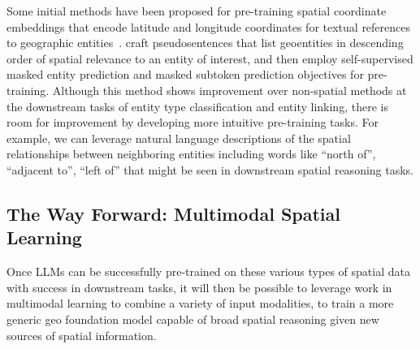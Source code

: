 Some initial methods have been proposed for pre-training spatial coordinate embeddings that encode latitude and longitude coordinates for textual references to geographic entities~\cite{Li2021}.
\citeauthor{Li2021} craft pseudosentences that list geoentities in descending order of spatial relevance to an entity of interest, and then employ self-supervised masked entity prediction and masked subtoken prediction objectives for pre-training.
Although this method shows improvement over non-spatial methods at the downstream tasks of entity type classification and entity linking, there is room for improvement by developing more intuitive pre-training tasks.
For example, we can leverage natural language descriptions of the spatial relationships between neighboring entities including words like ``north of'', ``adjacent to'', ``left of'' that might be seen in downstream spatial reasoning tasks.



\subsection{The Way Forward: Multimodal Spatial Learning}
Once LLMs can be successfully pre-trained on these various types of spatial data with success in downstream tasks, it will then be possible to leverage work in multimodal learning to combine a variety of input modalities, to train a more generic geo foundation model capable of broad spatial reasoning given new sources of spatial information.


